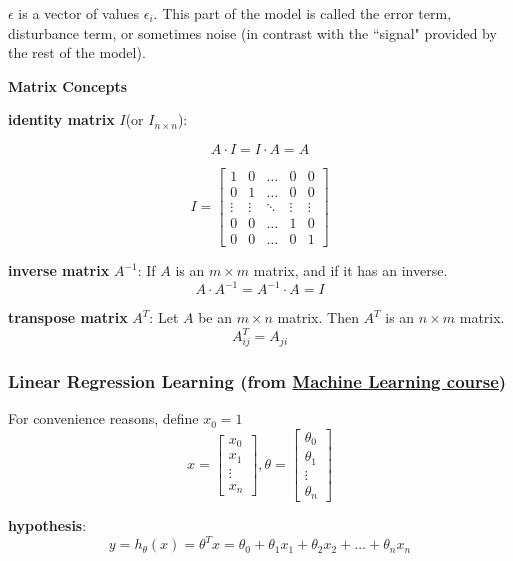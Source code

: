 \documentclass{article}
\begin{document}
\bigskip

\noindent \(\epsilon\) is a vector of values \(\epsilon_{i}\). This part of the model is called the error term, disturbance term, or sometimes noise (in contrast with the ``signal" provided by the rest of the model).

\bigskip

\noindent \textbf{Matrix Concepts}

\bigskip

\noindent \textbf{identity matrix} \(I\)(or \(I_{n \times n}\)):

\[A \cdot I = I \cdot A = A\]

\[
I = 
\begin{bmatrix}
1 & 0 & \dots & 0 & 0\\
0 & 1 & \dots & 0 & 0\\
\vdots & \vdots & \ddots & \vdots & \vdots\\
0 & 0 & \dots & 1 & 0\\
0 & 0 & \dots & 0 & 1
\end{bmatrix}
\]

\noindent \textbf{inverse matrix} \(A^{-1}\): If \(A\) is an \(m \times m\) matrix, and if it has an inverse.
\[A \cdot A^{-1} = A^{-1} \cdot A = I\]

\noindent \textbf{transpose matrix} \(A^{T}\): Let \(A\) be an \(m \times n\) matrix. Then \(A^T\) is an \(n \times m\) matrix.
\[A^T_{ij} = A_{ji}\]

\subsubsection{Linear Regression Learning (from \href{https://www.coursera.org/learn/machine-learning}{Machine Learning course})}

\noindent For convenience reasons, define \(x_0 = 1\)
\[
x = 
\begin{bmatrix}
x_0\\
x_1\\
\vdots\\
x_n
\end{bmatrix}
,
\theta = 
\begin{bmatrix}
\theta_0\\
\theta_1\\
\vdots\\
\theta_n
\end{bmatrix}
\]

\noindent \textbf{hypothesis}:
\[y = h_{\theta}(x) = \theta^T x = \theta_0 + \theta_1 x_1 + \theta_2 x_2 + \dots + \theta_n x_n\]
\end{document}

